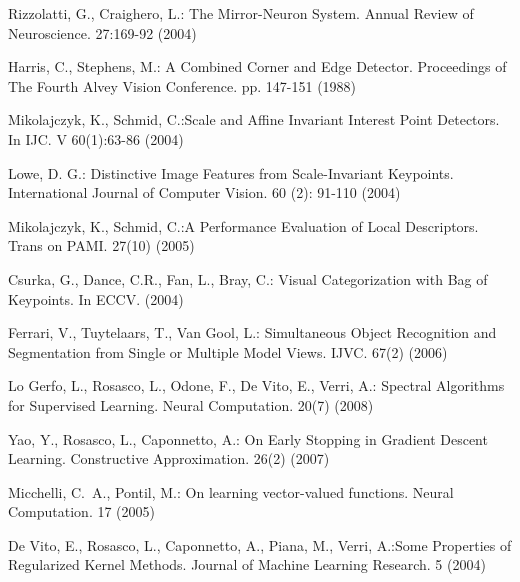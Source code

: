 \begin{thebibliography}{4}

 Rizzolatti, G., Craighero, L.: The Mirror-Neuron System. Annual Review of Neuroscience. 27:169-92 (2004)

 Harris, C., Stephens, M.: A Combined Corner and Edge Detector. Proceedings of The Fourth Alvey Vision Conference. pp. 147-151 (1988)

 Mikolajczyk, K., Schmid, C.:Scale and Affine Invariant Interest Point Detectors. In IJC. V 60(1):63-86 (2004)

 Lowe, D. G.: Distinctive Image Features from Scale-Invariant Keypoints. International Journal of Computer Vision. 60 (2): 91-110 (2004) 



 Mikolajczyk, K., Schmid, C.:A Performance Evaluation of Local Descriptors. Trans on PAMI. 27(10) (2005)


 Csurka, G., Dance, C.R., Fan, L., Bray, C.: Visual Categorization with Bag of Keypoints. In ECCV. (2004)

 Ferrari, V., Tuytelaars, T., Van Gool, L.: Simultaneous Object Recognition and Segmentation from Single or Multiple Model Views. IJVC. 67(2) (2006)

 Lo Gerfo, L., Rosasco, L., Odone, F., De Vito, E., Verri, A.:
  Spectral Algorithms for Supervised Learning. Neural Computation. 20(7) (2008)

   Yao, Y., Rosasco, L., Caponnetto, A.: On Early Stopping in Gradient Descent Learning.
   Constructive Approximation. 26(2) (2007)

 Micchelli, C.~A., Pontil, M.: On learning vector-valued functions.
  Neural Computation. 17 (2005)

 De Vito, E., Rosasco, L., Caponnetto, A., Piana, M.,	Verri, A.:Some Properties of Regularized Kernel Methods. Journal of Machine Learning Research. 5 (2004)


\end{thebibliography}
